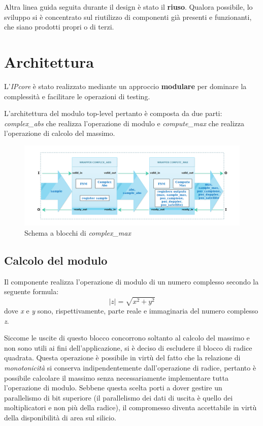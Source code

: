 \documentclass[12pt,a4paper,twoside,openany]{book}
\newcommand\abs[1]{\left|#1\right|}
\begin{document}
Altra linea guida seguita durante il design è stato il \textbf{riuso}. Qualora possibile, lo sviluppo si è concentrato sul riutilizzo di componenti già presenti e funzionanti, che siano prodotti propri o di terzi.
\section{Architettura}
L'\textit{IPcore} è stato realizzato mediante un approccio \textbf{modulare} per dominare la complessità e facilitare le operazioni di testing.

L'architettura del modulo top-level pertanto è composta da due parti: \textit{complex\_abs} che realizza l'operazione di modulo e \textit{compute\_max} che realizza l'operazione di calcolo del massimo.

\begin{figure}[hb]
\begin{center}
\includegraphics[scale=0.5, keepaspectratio]{immagini/complexmax_schemablocchi}
\caption{Schema a blocchi di \textit{complex\_max}}
\label{complexmax_top}
\end{center}
\end{figure}
\clearpage

\subsection{Calcolo del modulo}
Il componente realizza l'operazione di modulo di un numero complesso secondo la seguente formula:
$$
\abs{z} = \sqrt{x^{2}+y^{2}}
$$
dove \textit{x} e \textit{y} sono, rispettivamente, parte reale e immaginaria del numero complesso \textit{z}.

Siccome le uscite di questo blocco concorrono soltanto al calcolo del massimo e non sono utili ai fini dell'applicazione, si è deciso di escludere il blocco di radice quadrata. Questa operazione è possibile in virtù del fatto che la relazione di \textit{monotonicità} si conserva indipendentemente dall'operazione di radice, pertanto è possibile calcolare il massimo senza necessariamente implementare tutta l'operazione di modulo. Sebbene questa scelta porti a dover gestire un parallelismo di bit superiore (il parallelismo dei dati di uscita è quello dei moltiplicatori e non più della radice), il compromesso diventa accettabile in virtù della disponibilità di area sul silicio.
\end{document}

